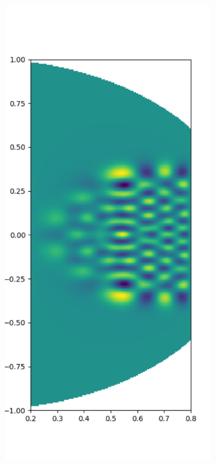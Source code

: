 \documentclass[11pt, oneside]{article}   	%
\begin{document}
\begin{figure}[t]
	\begin{subfigure}{0.3\textwidth}
	\centering
	\includegraphics[scale=0.3]{solution-helmholtz-diskslice-alpha=0p2-beta=0p8-k=100-n=300}

\end{subfigure}
\end{figure}
\end{document}
